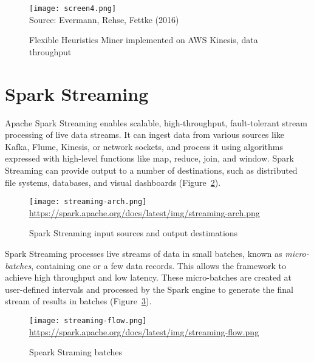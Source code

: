 \begin{figure}
\centering

\texttt{[image: screen4.png]} \\

\scriptsize Source: Evermann, Rehse, Fettke (2016) \normalsize
\caption[FHM on AWS Kinesis -- data throughput]{Flexible Heuristics Miner implemented on AWS Kinesis, data throughput}
\label{fig:fhmkinesisperformance}
\end{figure}

\FloatBarrier
\section{Spark Streaming}

Apache Spark Streaming enables scalable, high-throughput, fault-tolerant stream processing of live data streams. It can ingest data from various sources like Kafka, Flume, Kinesis, or network sockets, and process it using algorithms expressed with high-level functions like map, reduce, join, and window. Spark Streaming can provide output to a number of destinations, such as distributed file systems, databases, and visual dashboards (Figure~\ref{fig:sparkstreaming1}).

\begin{figure}
\centering

\texttt{[image: streaming-arch.png]} \\
\scriptsize\url{https://spark.apache.org/docs/latest/img/streaming-arch.png}\normalsize \\

\caption{Spark Streaming input sources and output destimations}
\label{fig:sparkstreaming1}
\end{figure}

Spark Streaming processes live streams of data in small batches, known as \emph{micro-batches}, containing one or a few data records. This allows the framework to achieve high throughput and low latency. These micro-batches are created at user-defined intervals and processed by the Spark engine to generate the final stream of results in batches (Figure~\ref{fig:sparkstreaming2}).

\begin{figure}
\centering

\texttt{[image: streaming-flow.png]}  \\

\scriptsize\url{https://spark.apache.org/docs/latest/img/streaming-flow.png}
\caption{Speark Straming batches}
\label{fig:sparkstreaming2}
\end{figure}

